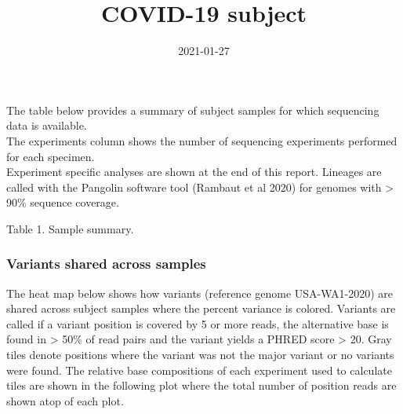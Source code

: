 \documentclass[12pt,]{article}
\title{COVID-19 subject}
\author{}
\date{2021-01-27}
\begin{document}
\maketitle

The table below provides a summary of subject samples for which
sequencing data is available.\\
The experiments column shows the number of sequencing experiments
performed for each specimen.\\
Experiment specific analyses are shown at the end of this report.
Lineages are called with the Pangolin software tool (Rambaut et al 2020)
for genomes with \textgreater{} 90\% sequence coverage.

\vspace{0.5cm}

\small
Table 1. Sample summary. \normalsize

\begin{table}[H]
\centering
{}
\end{table}

\newpage

\subsubsection{Variants shared across
samples}\label{variants-shared-across-samples}

The heat map below shows how variants (reference genome USA-WA1-2020)
are shared across subject samples where the percent variance is colored.
Variants are called if a variant position is covered by 5 or more reads,
the alternative base is found in \textgreater{} 50\% of read pairs and
the variant yields a PHRED score \textgreater{} 20. Gray tiles denote
positions where the variant was not the major variant or no variants
were found. The relative base compositions of each experiment used to
calculate tiles are shown in the following plot where the total number
of position reads are shown atop of each plot.
\end{document}

